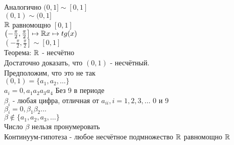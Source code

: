 Аналогично $ (0, 1] \sim [0,1] $\\
$ (0, 1) \sim (0,1] $\\
$\mathbb{R}$ равномощно $ [0, 1] $ \\
$ \left( -\frac{\pi}{2}, \frac{\pi}{2} \right] \mapsto \mathbb{R} \\
x \mapsto tg(x) $\\
$ \left( -\frac{\pi}{2}, \frac{\pi}{2} \right]  \sim [0, 1] $ \\
Теорема: $\mathbb{R}$ - несчётно \\
Достаточно доказать, что $ (0, 1) $ - несчётный.\\
Предположим, что это не так\\
$ (0, 1) = \{ a_1, a_2, \dots \} $ \\
$ a_i = 0,a_1a_2a_3a_4 $ Без 9 в периоде \\
$ \beta_i $ - любая цифра, отличная от $ a_{ii}, i=1,2,3,\dots$ 0 и 9\\
$ \beta_i = 0,\beta_1\beta_2\dots$\\
$\beta \notin \{ a_1, a_2, a_3, \dots \} $\\
Число $ \beta$ нельзя пронумеровать \\
Континуум-гипотеза - любое несчётное подмножество  $\mathbb{R}$  равномощно $\mathbb{R}$ \\




